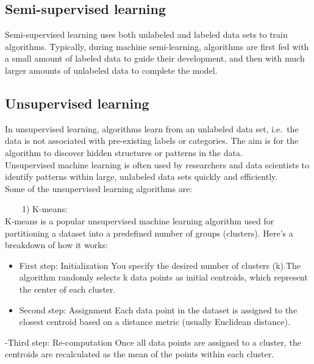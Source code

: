 \documentclass[
]{book}
\providecommand{\tightlist}{%
  \setlength{\itemsep}{0pt}\setlength{\parskip}{0pt}}
\begin{document}
\hypertarget{semi-supervised-learning}{%
\subsection*{Semi-supervised learning}\label{semi-supervised-learning}}

Semi-supervised learning uses both unlabeled and labeled data sets to train algorithms. Typically, during machine semi-learning, algorithms are first fed with a small amount of labeled data to guide their development, and then with much larger amounts of unlabeled data to complete the model.

\hypertarget{unsupervised-learning}{%
\subsection*{Unsupervised learning}\label{unsupervised-learning}}

In unsupervised learning, algorithms learn from an unlabeled data set, i.e.~the data is not associated with pre-existing labels or categories. The aim is for the algorithm to discover hidden structures or patterns in the data.\\
Unsupervised machine learning is often used by researchers and data scientists to identify patterns within large, unlabeled data sets quickly and efficiently.\\
Some of the unsupervised learning algorithms are:

~~~~1) K-means:\\
K-means is a popular unsupervised machine learning algorithm used for partitioning a dataset into a predefined number of groups (clusters). Here's a breakdown of how it works:

\begin{itemize}
\tightlist
\item
  First step: Initialization
  You specify the desired number of clusters (k).The algorithm randomly selects k data points as initial centroids, which represent the center of each cluster.\\
\item
  Second step: Assignment
  Each data point in the dataset is assigned to the closest centroid based on a distance metric (usually Euclidean distance).
\end{itemize}

-Third step: Re-computation
Once all data points are assigned to a cluster, the centroids are recalculated as the mean of the points within each cluster.
\end{document}
